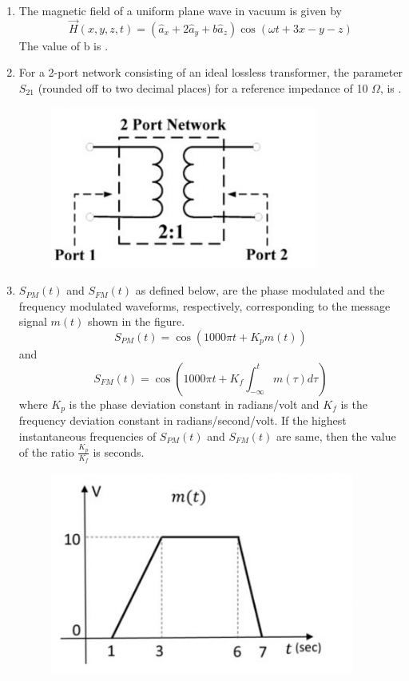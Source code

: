 \documentclass[a4paper, 11pt]{article}
\begin{document}
\begin{enumerate}
    \hfill{}
    
    \item The magnetic field of a uniform plane wave in vacuum is given by
    $$\vec{H}(x,y,z,t) = (\hat{a}_x + 2\hat{a}_y + b\hat{a}_z)\cos(\omega t + 3x - y - z)$$
    The value of b is \underline{\hspace{2cm}}.
    
    \hfill{}

    \item For a 2-port network consisting of an ideal lossless transformer, the parameter $S_{21}$ (rounded off to two decimal places) for a reference impedance of 10 $\Omega$, is \underline{\hspace{2cm}}.
    \begin{figure}[H]
        \centering
        \includegraphics[width=0.4\columnwidth]{figs/Q46.png}
        \caption*{}
        \label{fig:q56}
    \end{figure}
    
    \hfill{}

    \item $S_{PM}(t)$ and $S_{FM}(t)$ as defined below, are the phase modulated and the frequency modulated waveforms, respectively, corresponding to the message signal $m(t)$ shown in the figure.
    $$S_{PM}(t) = \cos(1000\pi t + K_p m(t))$$
    and
    $$S_{FM}(t) = \cos\left(1000\pi t + K_f \int_{-\infty}^{t} m(\tau)d\tau\right)$$
    where $K_p$ is the phase deviation constant in radians/volt and $K_f$ is the frequency deviation constant in radians/second/volt. If the highest instantaneous frequencies of $S_{PM}(t)$ and $S_{FM}(t)$ are same, then the value of the ratio $\frac{K_p}{K_f}$ is \underline{\hspace{2cm}} seconds.
    \begin{figure}[H]
        \centering
        \includegraphics[width=0.5\columnwidth]{figs/Q47.png}
        \caption*{}
        \label{fig:q57}
    \end{figure}


\end{enumerate}
\end{document}
